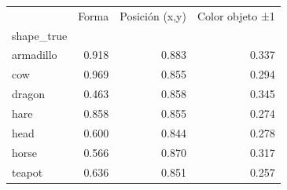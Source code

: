 \begin{tabular}{lrrr}
\toprule
 & Forma & Posición (x,y) & Color objeto ±1 \\
shape\_true &  &  &  \\
\midrule
armadillo & 0.918 & 0.883 & 0.337 \\
cow & 0.969 & 0.855 & 0.294 \\
dragon & 0.463 & 0.858 & 0.345 \\
hare & 0.858 & 0.855 & 0.274 \\
head & 0.600 & 0.844 & 0.278 \\
horse & 0.566 & 0.870 & 0.317 \\
teapot & 0.636 & 0.851 & 0.257 \\
\bottomrule
\end{tabular}
